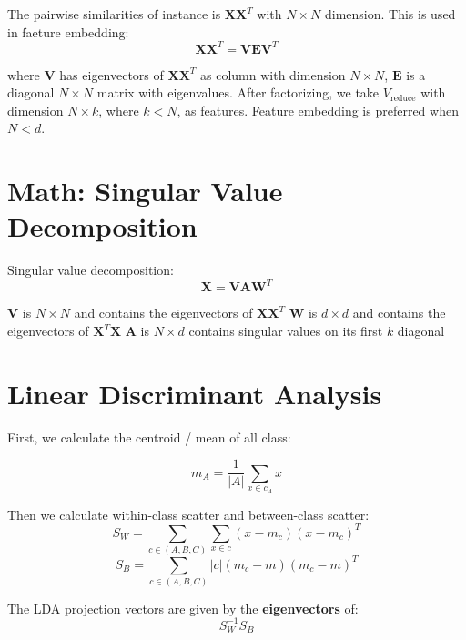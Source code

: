 \begin{multicols}{2}
\noindent The pairwise similarities of instance is $\mathbf{X} \mathbf{X}^{T}$ with $N\times N$ dimension. This is used in faeture embedding:
$$\mathbf{X} \mathbf{X}^{T} = \mathbf{VEV}^{T}$$

\noindent where $\mathbf{V}$ has eigenvectors of $\mathbf{X} \mathbf{X}^{T}$ as column with dimension $N\times N$, $\mathbf{E}$ is a diagonal $N\times N$ matrix with eigenvalues. After factorizing, we take $V_{\text{reduce}}$ with dimension $N\times k$, where $k<N$, as features. Feature embedding is preferred when $N<d$. 

\section{Math: Singular Value Decomposition}
\noindent Singular value decomposition:
$$\mathbf{X} = \mathbf{VAW}^{T}$$

\noindent $\mathbf{V}$ is $N\times N$ and contains the eigenvectors of $\mathbf{XX}^T$
\noindent $\mathbf{W}$ is $d\times d$ and contains the eigenvectors of $\mathbf{X}^T \mathbf{X}$
\noindent $\mathbf{A}$ is $N\times d$ contains singular values on its first $k$ diagonal

\section{Linear Discriminant Analysis}

\noindent First, we calculate the centroid / mean of all class:

$$m_A = \frac{1}{|A|} \sum_{x \in c_A} x$$

\noindent Then we calculate within-class scatter and between-class scatter:
$$S_W = \sum_{c \in (A,B,C)} \sum_{x \in c} (x-m_c)(x-m_c)^{T}$$
$$S_B = \sum_{c \in (A,B,C)} |c| (m_c - m)(m_c - m)^T$$

\noindent The LDA projection vectors are given by the \textbf{eigenvectors} of:
$$S_W^{-1}S_B$$

\end{multicols}
